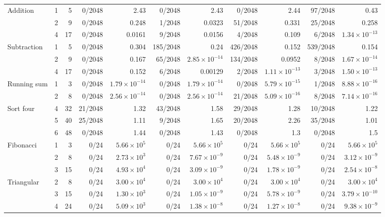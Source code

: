 \begin{table}[htbp]
{\begin{tabular}{@{}lrr *{8}{r}@{}}
Addition & 1 & 5 & 0/2048 & 2.43 & 0/2048 & 2.43 & 0/2048 & 2.44 & 97/2048 & 0.43 \\
 & 2 & 9 & 0/2048 & 0.248 & 1/2048 & 0.0323 & 51/2048 & 0.331 & 25/2048 & 0.258 \\
 & 4 & 17 & 0/2048 & 0.0161 & 9/2048 & 0.0156 & 4/2048 & 0.109 & 6/2048 & $1.34\!\times\!10^{-13}$ \\
Subtraction & 1 & 5 & 0/2048 & 0.304 & 185/2048 & 0.24 & 426/2048 & 0.152 & 539/2048 & 0.154 \\
 & 2 & 9 & 0/2048 & 0.167 & 65/2048 & $2.85\!\times\!10^{-14}$ & 134/2048 & 0.0952 & 8/2048 & $1.67\!\times\!10^{-14}$ \\
 & 4 & 17 & 0/2048 & 0.152 & 6/2048 & 0.00129 & 2/2048 & $1.11\!\times\!10^{-13}$ & 3/2048 & $1.50\!\times\!10^{-13}$ \\
Running sum & 1 & 3 & 0/2048 & $1.79\!\times\!10^{-14}$ & 0/2048 & $1.79\!\times\!10^{-14}$ & 0/2048 & $5.79\!\times\!10^{-15}$ & 1/2048 & $8.88\!\times\!10^{-16}$ \\
 & 2 & 8 & 0/2048 & $2.56\!\times\!10^{-14}$ & 0/2048 & $2.56\!\times\!10^{-14}$ & 21/2048 & $5.09\!\times\!10^{-16}$ & 8/2048 & $7.14\!\times\!10^{-16}$ \\
Sort four & 4 & 32 & 21/2048 & 1.32 & 43/2048 & 1.58 & 29/2048 & 1.28 & 10/2048 & 1.22 \\
 & 5 & 40 & 25/2048 & 1.11 & 9/2048 & 1.65 & 20/2048 & 2.26 & 35/2048 & 1.01 \\
 & 6 & 48 & 0/2048 & 1.44 & 0/2048 & 1.43 & 0/2048 & 1.3 & 0/2048 & 1.5 \\
Fibonacci & 1 & 3 & 0/24 & $5.66\!\times\!10^{5}$ & 0/24 & $5.66\!\times\!10^{5}$ & 0/24 & $5.66\!\times\!10^{5}$ & 0/24 & $5.66\!\times\!10^{5}$ \\
 & 2 & 8 & 0/24 & $2.73\!\times\!10^{3}$ & 0/24 & $7.67\!\times\!10^{-9}$ & 0/24 & $5.48\!\times\!10^{-9}$ & 0/24 & $3.12\!\times\!10^{-9}$ \\
 & 3 & 15 & 0/24 & $4.93\!\times\!10^{4}$ & 0/24 & $3.09\!\times\!10^{-9}$ & 0/24 & $1.78\!\times\!10^{-9}$ & 0/24 & $2.54\!\times\!10^{-8}$ \\
Triangular & 2 & 8 & 0/24 & $3.00\!\times\!10^{4}$ & 0/24 & $3.00\!\times\!10^{4}$ & 0/24 & $3.00\!\times\!10^{4}$ & 0/24 & $3.00\!\times\!10^{4}$ \\
 & 3 & 15 & 0/24 & $1.30\!\times\!10^{3}$ & 0/24 & $1.05\!\times\!10^{-9}$ & 0/24 & $5.78\!\times\!10^{-9}$ & 0/24 & $3.79\!\times\!10^{-10}$ \\
 & 4 & 24 & 0/24 & $5.09\!\times\!10^{3}$ & 0/24 & $1.38\!\times\!10^{-8}$ & 0/24 & $1.27\!\times\!10^{-8}$ & 0/24 & $9.38\!\times\!10^{-9}$ \\
\bottomrule
\end{tabular}}
\end{table}

